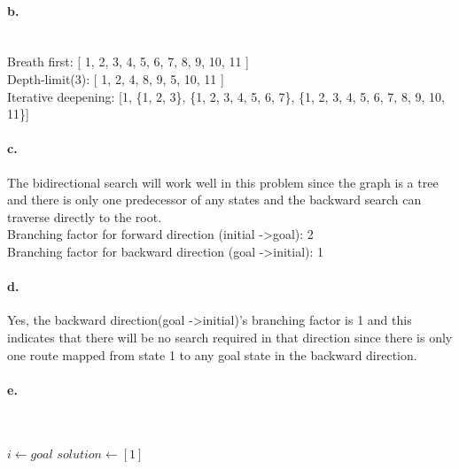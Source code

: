 \documentclass[a4paper]{article}
\begin{document}
\vspace{4 cm}

\paragraph{b.} ~\\
\indent Breath first: [ 1, 2, 3, 4, 5, 6, 7, 8, 9, 10, 11 ] \\
\indent Depth-limit(3): [ 1, 2, 4, 8, 9, 5, 10, 11 ] \\
\indent Iterative deepening: [1, \{1, 2, 3\}, \{1, 2, 3, 4, 5, 6, 7\}, \{1, 2, 3, 4, 5, 6, 7, 8, 9, 10, 11\}]

\paragraph{c.} The bidirectional search will work well in this problem since the graph is a tree and there is only one predecessor of any states and the backward search can traverse directly to the root. \\

\indent Branching factor for forward direction (initial -\textgreater goal): 2 \\
\indent Branching factor for backward direction (goal -\textgreater initial): 1

\vspace{4 cm}

\paragraph{d.} Yes, the backward direction(goal -\textgreater initial)'s branching factor is 1 and this indicates that there will be no search required in that direction since there is only one route mapped from state 1 to any goal state in the backward direction.

\paragraph{e.} ~\\
\begin{algorithm}[H]
	$i \longleftarrow goal$\;
	$solution \longleftarrow [1]$\;
	\;
\end{algorithm}
\end{document}

